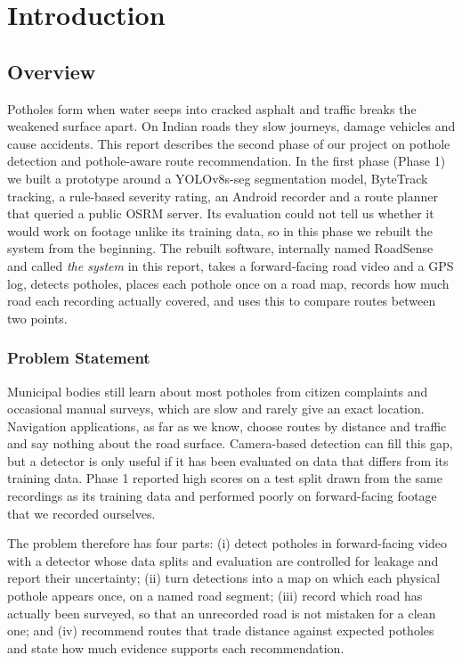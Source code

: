 \chapter{Introduction}\label{ch:intro}

\section{Overview}
Potholes form when water seeps into cracked asphalt and traffic breaks the weakened surface apart. On Indian roads they slow journeys, damage vehicles and cause accidents. This report describes the second phase of our project on pothole detection and pothole-aware route recommendation. In the first phase (Phase 1) we built a prototype around a YOLOv8s-seg segmentation model, ByteTrack tracking, a rule-based severity rating, an Android recorder and a route planner that queried a public OSRM server. Its evaluation could not tell us whether it would work on footage unlike its training data, so in this phase we rebuilt the system from the beginning. The rebuilt software, internally named RoadSense and called \emph{the system} in this report, takes a forward-facing road video and a GPS log, detects potholes, places each pothole once on a road map, records how much road each recording actually covered, and uses this to compare routes between two points.

\subsection{Problem Statement}
Municipal bodies still learn about most potholes from citizen complaints and occasional manual surveys, which are slow and rarely give an exact location. Navigation applications, as far as we know, choose routes by distance and traffic and say nothing about the road surface. Camera-based detection can fill this gap, but a detector is only useful if it has been evaluated on data that differs from its training data. Phase 1 reported high scores on a test split drawn from the same recordings as its training data and performed poorly on forward-facing footage that we recorded ourselves.

The problem therefore has four parts: (i) detect potholes in forward-facing video with a detector whose data splits and evaluation are controlled for leakage and report their uncertainty; (ii) turn detections into a map on which each physical pothole appears once, on a named road segment; (iii) record which road has actually been surveyed, so that an unrecorded road is not mistaken for a clean one; and (iv) recommend routes that trade distance against expected potholes and state how much evidence supports each recommendation.

